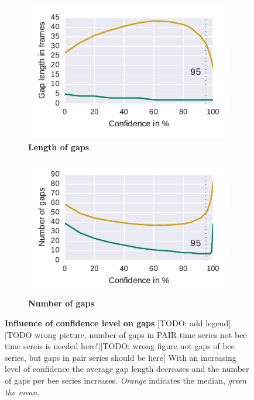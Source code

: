 \begin{figure}[htb]
	\centering
	\begin{subfigure}[b]{0.45\textwidth}
		\includegraphics[width=\textwidth]{Figures/gaplen}
		\caption[Length of gaps]{\textbf{Length of gaps}}
		\label{fig:gaplen}
	\end{subfigure}
	\begin{subfigure}[b]{0.45\textwidth}
		\includegraphics[width=\textwidth]{Figures/numgaps}
		\caption[Number of gaps]{\textbf{Number of gaps}}
		\label{fig:numgaps}
	\end{subfigure}
	\caption[Influence of Confidence Level on Gaps]{\textbf{Influence of confidence level on gaps} [TODO: add legend][TODO wrong picture, number of gaps in PAIR time series not bee time sereis is needed here!][TODO: wrong figure not gaps of bee series, but gaps in pair series should be here] With an increasing level of confidence the average gap length decreases and the number of gaps per bee series increases. \emph{Orange} indicates the median, \emph{green the mean}.\protect\footnotemark }
	\label{fig:gaps}
\end{figure}

